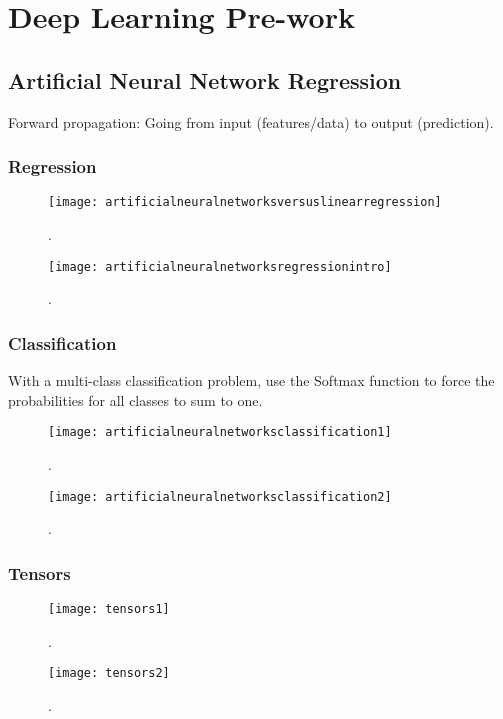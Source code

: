 	\chapter{Deep Learning Pre-work}
	\section{Artificial Neural Network Regression}

Forward propagation: Going from input (features/data) to output (prediction).

	\subsection{Regression}
 	\begin{figure}[h]
		\centering
		\texttt{[image: artificialneuralnetworksversuslinearregression]}
		\caption{.}
		\label{fig:artificialneuralnetworksversuslinearregression}
	\end{figure}


 	\begin{figure}[h]
		\centering
		\texttt{[image: artificialneuralnetworksregressionintro]}
		\caption{.}
		\label{fig:artificialneuralnetworksregressionintro}
	\end{figure}

	\subsection{Classification}
With a multi-class classification problem, use the Softmax function to force the probabilities for all classes to sum to one.

 	\begin{figure}[h]
		\centering
		\texttt{[image: artificialneuralnetworksclassification1]}
		\caption{.}
		\label{fig:artificialneuralnetworksclassification1}
	\end{figure}

 	\begin{figure}[h]
		\centering
		\texttt{[image: artificialneuralnetworksclassification2]}
		\caption{.}
		\label{fig:artificialneuralnetworksclassification2}
	\end{figure}

	\subsection{Tensors}

 	\begin{figure}[tbh]
		\centering
		\texttt{[image: tensors1]}
		\caption{.}
		\label{fig:tensors1}
	\end{figure}
 	\begin{figure}[tbh]
		\centering
		\texttt{[image: tensors2]}
		\caption{.}
		\label{fig:tensors2}
	\end{figure}

